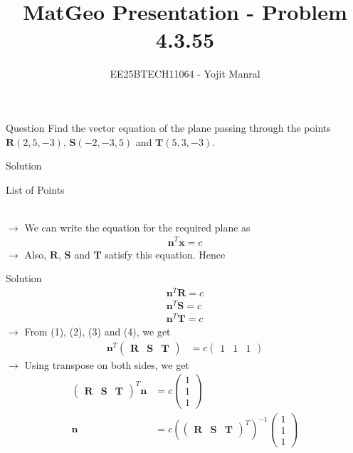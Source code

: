 \documentclass{beamer}
\title{MatGeo Presentation - Problem 4.3.55}
\author{EE25BTECH11064 - Yojit Manral}
\date{}
\numberwithin{equation}{section}
\providecommand{\brak}[1]{\ensuremath{\left(#1\right)}}
\theoremstyle{remark}
\newcommand{\myvec}[1]{\ensuremath{\begin{pmatrix}#1\end{pmatrix}}}
\let\vec\mathbf
\begin{document}
\frame{\titlepage}
\begin{frame}{Question}
Find the vector equation of the plane passing through the points $\vec{R}\brak{2, 5, -3}$, $\vec{S}\brak{-2, -3, 5}$ and $\vec{T}\brak{5, 3, -3}$.
\end{frame}

\begin{frame}{Solution}
\begin{table}[h!]    
  \centering
  
  \caption{List of Points}
  \label{Table_1}
\end{table}\\

$\rightarrow$ We can write the equation for the required plane as
\begin{align} \vec{n}^{T}\vec{x} = c \end{align}
$\rightarrow$ Also, $\vec{R}$, $\vec{S}$ and $\vec{T}$ satisfy this equation. Hence
\end{frame}

\begin{frame}{Solution}
\begin{align}
    \vec{n}^{T}\vec{R} = c \\
    \vec{n}^{T}\vec{S} = c \\
    \vec{n}^{T}\vec{T} = c
\end{align}
$\rightarrow$ From (1), (2), (3) and (4), we get
\begin{align} \vec{n}^{T}\myvec{\vec{R} & \vec{S} & \vec{T}} &= c\myvec{1 & 1 & 1} \end{align}
$\rightarrow$ Using transpose on both sides, we get
\begin{align}
    \myvec{\vec{R} & \vec{S} & \vec{T}}^{T} \vec{n} &= c\myvec{1\\1\\1} \\
    \vec{n} &= c \brak{\myvec{\vec{R} & \vec{S} & \vec{T}}^{T}}^{-1} \myvec{1\\1\\1} 
\end{align}
\end{frame}
\end{document}
